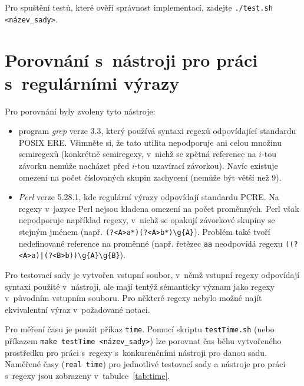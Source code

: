 \documentclass[thesis=B,czech]{FITthesis}[2019/12/23]
\theoremstyle{definition}
\begin{document}
Pro spuštění testů, které ověří správnost implementací, zadejte \texttt{./test.sh <název\_sady>}.  

\section{Porovnání s~nástroji pro práci s~regulárními výrazy}
 Pro porovnání byly zvoleny tyto nástroje:
 \begin{itemize}
	\item{program \emph{grep} verze 3.3, který používá syntaxi regexů odpovídající standardu POSIX ERE. Všimněte si, že tato utilita nepodporuje ani celou množinu semiregexů (konkrétně semiregexy, v~nichž se zpětná reference na $i$-tou závorku nemůže nacházet před $i$-tou uzavírací závorkou). Navíc existuje omezení na počet číslovaných skupin zachycení (nemůže být větší než 9).}
	\item{\emph{Perl} verze 5.28.1, kde regulární výrazy odpovídají standardu PCRE. Na regexy v~jazyce Perl nejsou kladena omezení na počet proměnných. Perl však nepodporuje například regexy, v~nichž se opakují závorkové skupiny se stejným jménem (např. \texttt{(?<A>a*)(?<A>b*)\textbackslash g\{A\}}). Problém také tvoří nedefinované reference na proměnné (např. řetězec \texttt{aa} neodpovídá regexu \texttt{((?<A>a)|(?<B>b))\textbackslash g\{A\}\textbackslash g\{B\}}). }
 \end{itemize}

Pro testovací sady je vytvořen vstupní soubor, v~němž vstupní regexy odpovídají syntaxi použité v~nástroji, ale mají tentýž sémanticky význam jako regexy v~původním vstupním souboru. Pro některé regexy nebylo možné najít ekvivalentní výraz v~požadované notaci.

Pro měření času je použít příkaz \texttt{time}. Pomocí skriptu \texttt{testTime.sh} (nebo příkazem \texttt{make testTime <název\_sady>}) lze porovnat čas běhu vytvořeného prostředku pro práci s~regexy s~konkurenčními nástroji pro danou sadu. 
Naměřené časy (\texttt{real time}) pro jednotlivé testovací sady a nástroje pro práci s~regexy jsou zobrazeny v~tabulce~\ref{tab:time}. 
\end{document}
